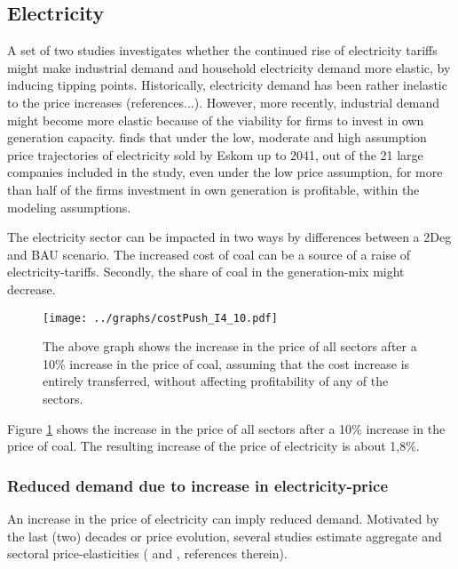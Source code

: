 \documentclass[12pt,english]{article}
\begin{document}
\subsection{Electricity}

A set of two studies investigates whether the continued rise of electricity tariffs might make industrial demand \citep{goliger2018electricity} and household electricity demand \citep{goliger2018household} more elastic, by inducing tipping points. Historically, electricity demand has been rather inelastic to the price increases (references...). However, more recently, industrial demand might become more elastic because of the viability for firms to invest in own generation capacity. \citep{goliger2018electricity} finds that under the low, moderate and high assumption price trajectories of electricity sold by Eskom up to 2041, out of the 21 large companies included in the study, even under the low price assumption, for more than half of the firms investment in own generation is profitable, within the modeling assumptions.


The electricity sector can be impacted in two ways by differences between a 2Deg and BAU scenario. The increased cost of coal can be a source of a raise of electricity-tariffs. Secondly, the share of coal in the generation-mix might decrease.

\begin{figure}[!h]
	\hspace{-10pt}\texttt{[image: ../graphs/costPush\_I4\_10.pdf]}
	\caption{\label{costPush_I4_10} The above graph shows the increase in the price of all sectors after a 10\% increase in the price of coal, assuming that the cost increase is entirely transferred, without affecting profitability of any of the sectors.}
\end{figure}

Figure \ref{costPush_I4_10} shows the increase in the price of all sectors after a 10\% increase in the price of coal. The resulting increase of the price of electricity is about 1,8\%.

\subsubsection{Reduced demand due to increase in electricity-price}

An increase in the price of electricity can imply reduced demand. Motivated by the last (two) decades or price evolution, several studies estimate aggregate and sectoral price-elasticities (\cite{inglesi2010forecasting} and \cite{goliger2018electricity}, references therein). 
\end{document}
